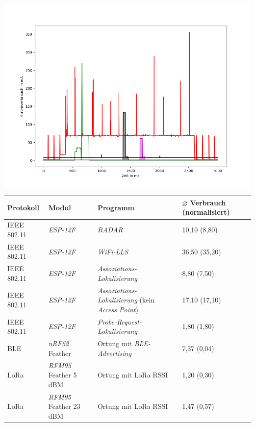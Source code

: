 \documentclass[18pt]{beamer}
\begin{document}
\begin{frame}
	\begin{minipage}[c][\textheight][c]{\textwidth}
		\centering
		\includegraphics[height=0.95\textheight]{plots/alle4.png}
	\end{minipage}
\end{frame}

\begin{frame}
	\begin{tabular}{l|p{3cm}|p{3.1cm}|R{2.1cm}}
		Protokoll & Modul & Programm  & $\varnothing$ Verbrauch (normalisiert)\\
		\hline
		IEEE 802.11 & \emph{ESP-12F} & \emph{RADAR} & 10,10 (8,80) \\
		\hline
		IEEE 802.11 & \emph{ESP-12F} & \emph{WiFi-LLS} & 36,50 (35,20)\\
		\hline
		IEEE 802.11 & \emph{ESP-12F} & \emph{Assoziations-Lokalisierung} & 8,80 (7,50)\\
		IEEE 802.11 & \emph{ESP-12F} & \emph{Assoziations-Lokalisierung} (kein \emph{Access Point}) & 17,10 (17,10)\\
		\hline
		IEEE 802.11 & \emph{ESP-12F} & \emph{Probe-Request-Lokalisierung} & 1,80 (1,80)\\
		\hline
		BLE & \emph{nRF52} Feather & Ortung mit \emph{BLE-Advertising} & 7,37 (0,04)\\
		\hline
		LoRa & \emph{RFM95} Feather 5 dBM & Ortung mit LoRa RSSI & 1,20 (0,30)\\
		LoRa & \emph{RFM95} Feather 23 dBM & Ortung mit LoRa RSSI & 1,47 (0,57)\\
	\end{tabular}
\end{frame}
\end{document}
